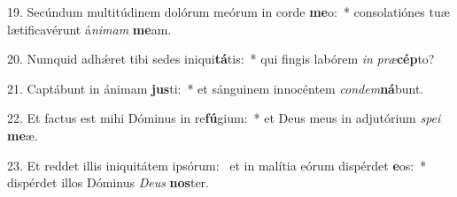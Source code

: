 19. Secúndum multitúdinem dolórum meórum in corde \textbf{me}o:~*  consolatiónes tuæ lætificavérunt á\textit{ni}\textit{mam} \textbf{me}am.\

20. Numquid adhǽret tibi sedes iniqui\textbf{tá}tis:~*  qui fingis labórem \textit{in} \textit{præ}\textbf{cép}to?\

21. Captábunt in ánimam \textbf{jus}ti:~*  et sánguinem innocéntem \textit{con}\textit{dem}\textbf{ná}bunt.\

22. Et factus est mihi Dóminus in re\textbf{fú}gium:~*  et Deus meus in adjutórium \textit{spe}\textit{i} \textbf{me}æ.\

23. Et reddet illis iniquitátem ipsórum: \dag\  et in malítia eórum dispérdet \textbf{e}os:~*  dispérdet illos Dóminus \textit{De}\textit{us} \textbf{nos}ter.\

